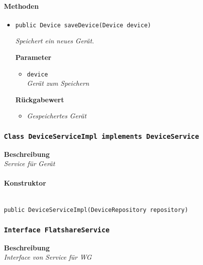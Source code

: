      \paragraph*{Methoden}
     \begin{itemize}
     	\item{\texttt{public Device saveDevice(Device device)}}
     	
     	\textit{Speichert ein neues Gerät.}
     	
     	\textbf{Parameter}
     	\begin{itemize}
     		\item\texttt{device}\\
     		\textit{Gerät zum Speichern}
     	\end{itemize}
     
     	\textbf{Rückgabewert}
     	\begin{itemize}
     		\item\textit{Gespeichertes Gerät}
     	\end{itemize}
     \end{itemize}
 
     \subsubsection{\texttt{Class DeviceServiceImpl implements DeviceService}}
     \textbf{Beschreibung} \\
     \textit{Service für Gerät}
     \paragraph*{Konstruktor}\mbox{} \\
     \texttt{public DeviceServiceImpl(DeviceRepository repository)}
     \subsubsection{\texttt{Interface FlatshareService}}
     \textbf{Beschreibung} \\
     \textit{Interface von Service für WG}
